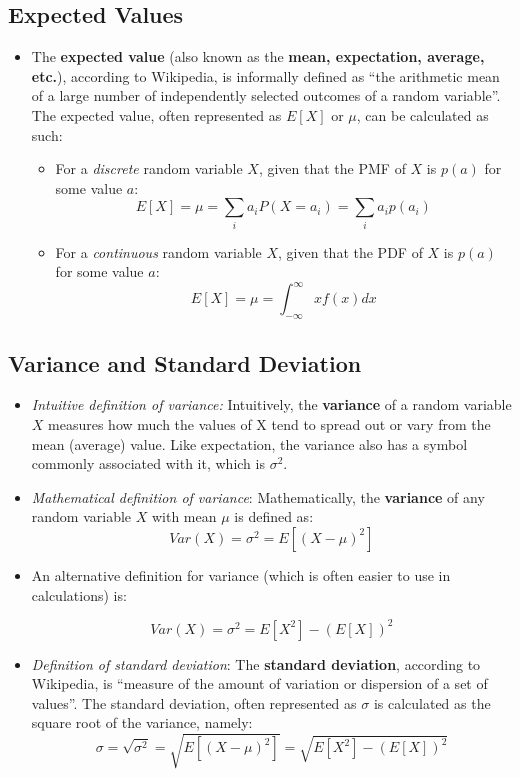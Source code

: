 \documentclass[12pt]{article}
\begin{document}
\subsection{Expected Values}
\begin{itemize}
	\item The \textbf{expected value} (also known as the \textbf{mean, expectation,
		      average, etc.}), according to Wikipedia, is informally
	      defined as ``the arithmetic mean of a large number of independently selected
	      outcomes of a random variable''. The expected value, often represented as $E[X]$ or $\mu$,
	      can be calculated as such:
	      \begin{itemize}
		      \item For a \textit{discrete} random variable $X$, given that the PMF of $X$ is $p(a)$ for some value $a$:
		            \[
			            E[X] = \mu = \displaystyle\sum_{i} a_i P(X=a_i) = \displaystyle\sum_{i} a_i p(a_i)
		            \]
		      \item For a \textit{continuous} random variable $X$, given that the PDF of $X$ is $p(a)$ for some value $a$:
		            \[
			            E[X] = \mu = \int_{-\infty}^{\infty}x f(x) dx
		            \]
	      \end{itemize}
\end{itemize}


\subsection{Variance and Standard Deviation}
\begin{itemize}
	\item \textit{Intuitive definition of variance:} Intuitively, the \textbf{variance} of a random variable $X$ measures how much
	      the values of X tend to spread out or vary from the mean (average) value. Like
	      expectation, the variance also has a symbol commonly associated with it, which is $\sigma^2$.
	\item \textit{Mathematical definition of variance}: Mathematically, the \textbf{variance} of any random variable $X$ with mean $\mu$
	      is defined as:
	      \[
		      Var(X) = \sigma^2 = E[(X-\mu)^2]
	      \]
	\item  An alternative definition for variance (which is often easier to use in calculations) is:

	      \[
		      Var(X) = \sigma^2 = E[X^2] - (E[X])^2
	      \]
	\item \textit{Definition of standard deviation}: The \textbf{standard
		      deviation}, according to Wikipedia, is ``measure of the amount of
	      variation or dispersion of a set of values''. The standard deviation,
	      often represented as $\sigma$ is calculated as the square root of the
	      variance, namely:
	      \[
		      \sigma = \sqrt{\sigma^2} = \sqrt{E[(X-\mu)^2]} = \sqrt{E[X^2] - (E[X])^2}
	      \]
\end{itemize}
\end{document}
